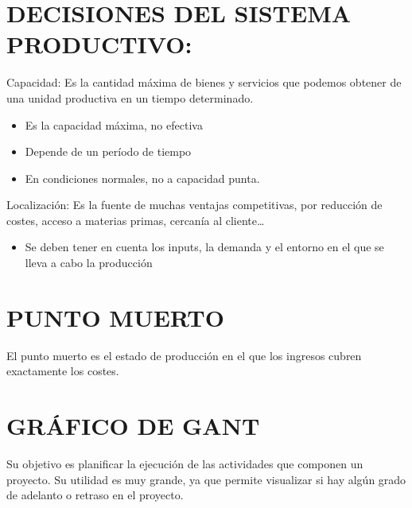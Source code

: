 \documentclass[12pt, twoside, openright]{report} %
\begin{document}
\section{DECISIONES DEL SISTEMA PRODUCTIVO:}

Capacidad: Es la cantidad máxima de bienes y servicios que podemos obtener de una unidad productiva en un tiempo determinado.
\begin{itemize}
	\item Es la capacidad máxima, no efectiva
	\item Depende de un período de tiempo
	\item En condiciones normales, no a capacidad punta.
\end{itemize}	
Localización: Es la fuente de muchas ventajas competitivas, por reducción de costes, acceso a materias primas, cercanía al cliente…
\begin{itemize}
	\item Se deben tener en cuenta los inputs, la demanda y el entorno en el que se lleva a cabo la producción
\end{itemize}

\section{PUNTO MUERTO}

El punto muerto es el estado de producción en el que los ingresos cubren exactamente los costes.

\section{GRÁFICO DE GANT}
Su objetivo es planificar la ejecución de las actividades que componen un proyecto. Su utilidad es muy grande, ya que permite visualizar si hay algún grado de adelanto o retraso en el proyecto.
\end{document}
